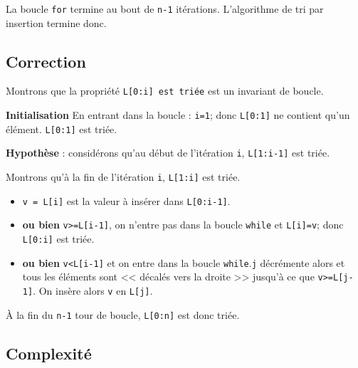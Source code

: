 La boucle \texttt{for} termine au bout de \texttt{n-1} itérations. L'algorithme de tri par insertion termine donc.

\subsection{Correction}
Montrons que la propriété \texttt{L[0:i] est triée} est un invariant de boucle.

\textbf{Initialisation} 
En entrant dans la boucle : \texttt{i=1}; donc \texttt{L[0:1]} ne contient qu'un élément. \texttt{L[0:1]} est triée.

\textbf{Hypothèse} : considérons qu'au début de l'itération \texttt{i}, \texttt{L[1:i-1]} est triée. 

Montrons qu'à la fin de l'itération \texttt{i}, \texttt{L[1:i]} est triée. 
\begin{itemize}
\item \texttt{v = L[i]} est la valeur à insérer dans \texttt{L[0:i-1]}.
\item \textbf{ou bien} \texttt{v>=L[i-1]}, on n'entre pas dans la boucle \texttt{while} et \texttt{L[i]=v}; donc \texttt{L[0:i]} est triée. 
\item \textbf{ou bien} \texttt{v<L[i-1]} et on entre dans la boucle \texttt{while}.\texttt{j} décrémente alors et tous les éléments sont << décalés vers la droite >>  jusqu'à ce que \texttt{v>=L[j-1]}. On insère alors \texttt{v} en \texttt{L[j]}.
\end{itemize}

À la fin du \texttt{n-1} tour de boucle, \texttt{L[0:n]} est donc triée. 


\subsection{Complexité}

